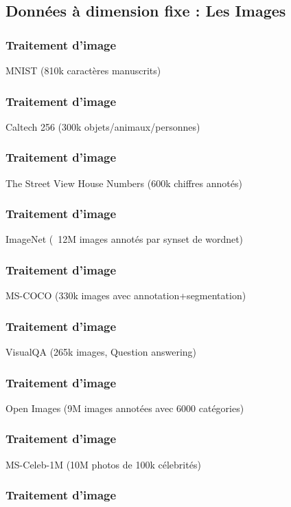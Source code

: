\subsection{Données à dimension fixe : Les Images}



\begin{frame}
  \frametitle{Traitement d'image}
  MNIST (810k caractères manuscrits)
\end{frame}

\begin{frame}
  \frametitle{Traitement d'image}
  Caltech 256 (300k objets/animaux/personnes)
\end{frame}

\begin{frame}
  \frametitle{Traitement d'image}
  The Street View House Numbers (600k chiffres annotés)
\end{frame}

\begin{frame}
  \frametitle{Traitement d'image}
  ImageNet (~12M images annotés par synset de wordnet)
\end{frame}

\begin{frame}
  \frametitle{Traitement d'image}
  MS-COCO (330k images avec annotation+segmentation)
\end{frame}

\begin{frame}
  \frametitle{Traitement d'image}
  VisualQA (265k images, Question answering)
\end{frame}

\begin{frame}
  \frametitle{Traitement d'image}
  Open Images (9M images annotées avec 6000 catégories)
\end{frame}

\begin{frame}
  \frametitle{Traitement d'image}
  MS-Celeb-1M (10M photos de 100k célebrités)
\end{frame}

\begin{frame}
  \frametitle{Traitement d'image}
  \begin{center}
  \end{center}
\end{frame}

